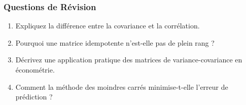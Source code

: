 \documentclass{beamer}
\begin{document}
\begin{frame}
  \frametitle{Questions de Révision}
  \begin{enumerate}
    \item Expliquez la différence entre la covariance et la corrélation.
    \item Pourquoi une matrice idempotente n'est-elle pas de plein rang ?
    \item Décrivez une application pratique des matrices de variance-covariance en économétrie.
    \item Comment la méthode des moindres carrés minimise-t-elle l'erreur de prédiction ?
  \end{enumerate}
\end{frame}
\end{document}
